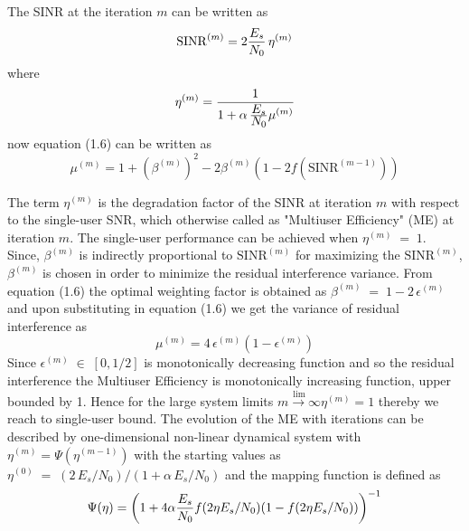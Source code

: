 The SINR at the iteration $m$ can be written as
\begin{equation}
\mathrm{SINR}^{(m)}=2\frac{\hbox{$E_s$}}{\hbox{$N_0$}}\,\eta^{(m)}
\end{equation}
where
\begin{equation}
\eta^{(m)}=\frac{\hbox{$1$}}{\hbox{$1+\alpha\,\frac{\hbox{$E_s$}}{\hbox{$N_0$}}\mu^{(m)}$}}
\end{equation}
now equation (1.6) can be written as
\begin{equation}
\mu^{(m)}=1+\left(\beta^{(m)}\right)^2-2\beta^{(m)}\left(1-2f\left(\mathrm{SINR}^{(m-1)}\right)\right)
\end{equation}

The term $\eta^{(m)}$ is the degradation factor of the SINR at iteration $m$ with respect to the single-user SNR, which otherwise called as "Multiuser Efficiency" (ME) at iteration $m$. The single-user performance can be achieved when $\eta^{(m)}\;=\;1$. Since, $\beta^{(m)}$ is indirectly proportional to $\mathrm{SINR}^{(m)}$ for maximizing the $\mathrm{SINR}^{(m)}$, $\beta^{(m)}$ is chosen in order to minimize the residual interference variance. From equation (1.6) the optimal weighting factor is obtained as $\beta^{(m)}\;=\;1-2\,\epsilon^{(m)}$ and upon substituting in equation (1.6) we get the variance of residual interference as
\begin{equation}
\mu^{(m)}=4\,\epsilon^{(m)}\left(1-\epsilon^{(m)}\right)
\end{equation}
Since $\epsilon^{(m)}\;\in\;[0,1/2]$ is monotonically decreasing function and so the residual interference the Multiuser Efficiency is monotonically increasing function, upper bounded by 1. Hence for the large system limits $\stackrel{\mathrm{lim}}{m\rightarrow \infty}\eta^{(m)}=1$ thereby we reach to single-user bound. The evolution of the ME with iterations can be described by one-dimensional non-linear dynamical system with $\eta^{(m)}=\Psi\left(\eta^{(m-1)}\right)$ with the starting values as $\eta^{(0)}\;=\;(2\,E_s/N_0)/(1+\alpha\,E_s/N_0)$ and the mapping function is defined as
\begin{equation}
\Psi(\eta)=\left(1+4\alpha \frac{\hbox{$E_s$}}{\hbox{$N_0$}}f(2\eta E_s/N_0)(1-f(2\eta E_s/N_0))\right)^{-1}
\end{equation}



